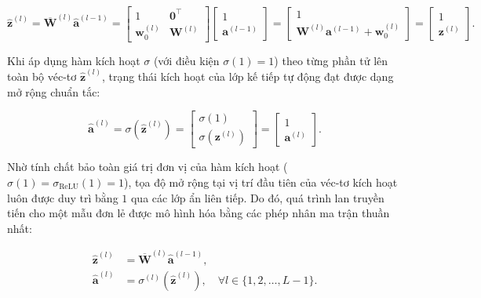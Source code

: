 \begin{equation}
    \hat{\mathbf{z}}^{(l)} = \overline{\mathbf{W}}^{(l)} \hat{\mathbf{a}}^{(l-1)} = \begin{bmatrix} 1 & \mathbf{0}^\top \\ \mathbf{w}_0^{(l)} & \mathbf{W}^{(l)} \end{bmatrix} \begin{bmatrix} 1 \\ \mathbf{a}^{(l-1)} \end{bmatrix} = \begin{bmatrix} 1 \\ \mathbf{W}^{(l)} \mathbf{a}^{(l-1)} + \mathbf{w}_0^{(l)} \end{bmatrix} = \begin{bmatrix} 1 \\ \mathbf{z}^{(l)} \end{bmatrix}.
\end{equation}

Khi áp dụng hàm kích hoạt $\sigma$ (với điều kiện $\sigma(1) = 1$) theo từng phần tử lên toàn bộ véc-tơ $\hat{\mathbf{z}}^{(l)}$, trạng thái kích hoạt của lớp kế tiếp tự động đạt được dạng mở rộng chuẩn tắc:

\begin{equation}
    \hat{\mathbf{a}}^{(l)} = \sigma\left(\hat{\mathbf{z}}^{(l)}\right) = \begin{bmatrix} \sigma(1) \\ \sigma\left(\mathbf{z}^{(l)}\right) \end{bmatrix} = \begin{bmatrix} 1 \\ \mathbf{a}^{(l)} \end{bmatrix}.
\end{equation}

Nhờ tính chất bảo toàn giá trị đơn vị của hàm kích hoạt ($\sigma(1) = \sigma_{\text{ReLU}}(1) = 1$), tọa độ mở rộng tại vị trí đầu tiên của véc-tơ kích hoạt luôn được duy trì bằng $1$ qua các lớp ẩn liên tiếp. Do đó, quá trình lan truyền tiến cho một mẫu đơn lẻ được mô hình hóa bằng các phép nhân ma trận thuần nhất:

\begin{align}
    \hat{\mathbf{z}}^{(l)} &= \overline{\mathbf{W}}^{(l)} \hat{\mathbf{a}}^{(l-1)}, \\
    \hat{\mathbf{a}}^{(l)} &= \sigma^{(l)}\left(\hat{\mathbf{z}}^{(l)}\right), \quad \forall l \in \{1, 2, \dots, L-1\}.
\end{align}

